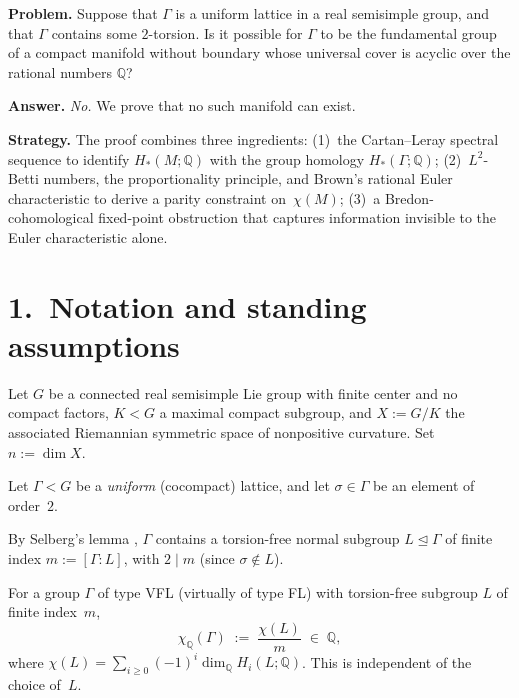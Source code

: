 

\noindent\textbf{Problem.}
Suppose that $\Gamma$ is a uniform lattice in a real semisimple group, and that
$\Gamma$ contains some $2$-torsion. Is it possible for $\Gamma$ to be the
fundamental group of a compact manifold without boundary whose universal cover
is acyclic over the rational numbers $\mathbb{Q}$?


\bigskip
\noindent\textbf{Answer.} \textit{No.} We prove that no such manifold can exist.

\medskip
\noindent\textbf{Strategy.}
The proof combines three ingredients:
(1)~the Cartan--Leray spectral sequence to identify
$H_*(M;\mathbb{Q})$ with the group homology $H_*(\Gamma;\mathbb{Q})$;
(2)~$L^2$-Betti numbers, the proportionality principle, and Brown's rational
Euler characteristic to derive a parity constraint on~$\chi(M)$;
(3)~a Bredon-cohomological fixed-point obstruction
that captures information invisible to the Euler characteristic alone.

\section*{1.\ Notation and standing assumptions}
\label{sec:p7-setup}

Let $G$ be a connected real semisimple Lie group with finite center and no
compact factors, $K<G$ a maximal compact subgroup, and
$X := G/K$ the associated Riemannian symmetric space of nonpositive curvature.
Set $n := \dim X$.

Let $\Gamma < G$ be a \emph{uniform} (cocompact) lattice, and let
$\sigma\in\Gamma$ be an element of order~$2$.

By Selberg's lemma \cite{Sel60}, $\Gamma$ contains a torsion-free normal
subgroup $L\trianglelefteq\Gamma$ of finite index
$m := [\Gamma:L]$, with $2\mid m$ (since $\sigma\notin L$).

\begin{definition}
\label{def:p7-chi-Q}
For a group $\Gamma$ of type VFL (virtually of type FL) with torsion-free
subgroup $L$ of finite index~$m$,
\[
  \chi_\mathbb{Q}(\Gamma)
  \;:=\;
  \frac{\chi(L)}{m}
  \;\in\;\mathbb{Q},
\]
where $\chi(L) = \sum_{i\ge 0}(-1)^i\dim_\mathbb{Q} H_i(L;\mathbb{Q})$.
This is independent of the choice of~$L$.
\end{definition}


